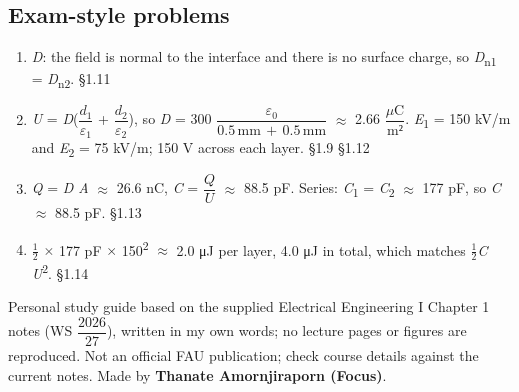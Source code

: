 \documentclass[11pt]{article}
\begin{document}
\begin{keepsection}\subsection{Exam-style problems}

\begin{enumerate}
\item \textit{D}: the field is normal to the interface and there is no surface charge, so \textit{D}\textsubscript{n1} = \textit{D}\textsubscript{n2}. \hfill{\small\color{FAUblue}§1.11}
\item \textit{U} = \textit{D}({\small\ensuremath{\dfrac{{d}_{1}}{ε_{1}}}} + {\small\ensuremath{\dfrac{{d}_{2}}{ε_{2}}}}), so \textit{D} = 300 {\small\ensuremath{\dfrac{ε_{0}}{0.5\, \text{mm}\, +\, 0.5\, \text{mm}}}} \ensuremath{\approx} 2.66 {\small\ensuremath{\dfrac{μ\mathrm{C}}{\mathrm{m}²}}}. \textit{E}\textsubscript{1} = 150 kV/m and \textit{E}\textsubscript{2} = 75 kV/m; 150 V across each layer. \hfill{\small\color{FAUblue}§1.9} \hfill{\small\color{FAUblue}§1.12}
\item \textit{Q} = \textit{D A} \ensuremath{\approx} 26.6 nC, \textit{C} = {\small\ensuremath{\dfrac{{Q}}{{U}}}} \ensuremath{\approx} 88.5 pF. Series: \textit{C}\textsubscript{1} = \textit{C}\textsubscript{2} \ensuremath{\approx} 177 pF, so \textit{C} \ensuremath{\approx} 88.5 pF. \hfill{\small\color{FAUblue}§1.13}
\item \ensuremath{\tfrac12} \ensuremath{\times} 177 pF \ensuremath{\times} 150\textsuperscript{2} \ensuremath{\approx} 2.0 μJ per layer, 4.0 μJ in total, which matches \ensuremath{\tfrac12}\textit{C U}\textsuperscript{2}. \hfill{\small\color{FAUblue}§1.14}
\end{enumerate}

\end{keepsection}

\vfill{\small Personal study guide based on the supplied Electrical Engineering I Chapter 1 notes (WS {\small\ensuremath{\dfrac{2026}{27}}}), written in my own words; no lecture pages or figures are reproduced. Not an official FAU publication; check course details against the current notes. Made by \textbf{Thanate Amornjiraporn (Focus)}.}
\end{document}
